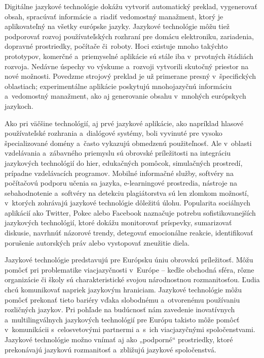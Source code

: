 \begin{multicols}{2}
Digitálne jazykové technológie dokážu vytvoriť automatický preklad, vygenerovať obsah, spracúvať informácie a~riadiť vedomostný manažment, ktorý je aplikovateľný na všetky európske jazyky. Jazykové technológie môžu tiež podporovať rozvoj používateľských rozhraní pre domácu elektroniku, zariadenia, dopravné prostriedky, počítače či~roboty. Hoci existuje mnoho takýchto prototypov, komerčné a~priemyselné aplikácie sú stále iba v~prvotných štádiách rozvoja. Nedávne úspechy vo výskume a~rozvoji vytvorili skutočný priestor na nové možnosti. Povedzme strojový preklad je už primerane presný v~špecifických oblastiach; experimentálne aplikácie poskytujú mnohojazyčnú informáciu a~vedomostný manažment, ako aj generovanie obsahu v~mnohých európskych jazykoch.

Ako pri väčšine technológií, aj prvé jazykové aplikácie, ako napríklad hlasové používateľské rozhrania a~dialógové systémy, boli vyvinuté pre vysoko špecializované domény a~často vykazujú obmedzenú použiteľnosť. Ale v~oblasti vzdelávania a~zábavného priemyslu sú obrovské príležitosti na integráciu jazykových technológií do hier, edukačných pomôcok, simulačných prostredí, prípadne vzdelávacích programov. Mobilné informačné služby, softvéry na počítačovú podporu učenia sa jazyka, e-learningové prostredia, nástroje na sebahodnotenie a~softvéry na detekciu plagiátorstva sú len zlomkom možností, v~ktorých zohrávajú jazykové technológie dôležitú úlohu. Popularita sociálnych aplikácií ako Twitter, Pokec alebo Facebook naznačuje potrebu sofistikovanejších jazykových technológií, ktoré dokážu monitorovať príspevky, sumarizovať diskusie, navrhnúť názorové trendy, detegovať emocionálne reakcie, identifikovať porušenie autorských práv alebo vystopovať zneužitie diela.


Jazykové technológie predstavujú pre Eu\-róp\-sku úniu obrovskú
príležitosť. Môžu pomôcť pri problematike viacjazyčnosti
v~Eu\-ró\-pe – keďže  obchodná sféra, rôzne organizácie či školy
sú charakteristické svojou národnostnou rozmanitosťou. Ľudia chcú
komunikovať napriek jazykovým hraniciam. Jazykové technológie môžu
pomôcť prekonať tieto bariéry vďaka slobodnému a~otvorenému
používaniu rozličných jazykov. Pri pohľade na budúcnosť nám
zavedenie inovatívnych a~multilingválnych jazykových technológií
pre Európu takisto môže pomôcť v~komunikácii s~celosvetovými
partnermi a~s~ich   viacjazyčnými spoločenstvami. Jazykové
technológie možno vnímať aj ako „podporné“ prostriedky, ktoré
prekonávajú jazykovú rozmanitosť a~zbližujú jazykové
spoločenstvá.


\end{multicols}
